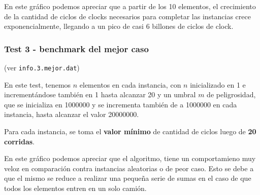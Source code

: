 \vspace*{0.5cm}


\vspace*{0.5cm}

En este gráfico podemos apreciar que a partir de los 10 elementos, el
crecimiento de la cantidad de ciclos de clocks necesarios para completar las
instancias crece exponencialmente, llegando a un pico de casi 6 billones de
ciclos de clock.


\newpage
\subsubsection{Test 3 - benchmark del mejor caso}

(ver \verb|info.3.mejor.dat|) \medskip

En este test, tenemos $n$ elementos en cada instancia, con $n$ inicializado en 1 e incrementándose
también en 1 hasta alcanzar 20 y un umbral $m$ de peligrosidad, que se inicializa en 1000000 y se incrementa
también de a 1000000 en cada instancia, hasta alcanzar el valor 20000000.

Para cada instancia, se toma el \textbf{valor mínimo} de cantidad de ciclos luego de \textbf{20 corridas}.




En este gráfico podemos apreciar que el algoritmo, tiene un comportamieno
muy veloz en comparación contra instancias aleatorias o de peor caso. Esto
se debe a que el mismo se reduce a realizar una pequeña serie de sumas en el
caso de que todos los elementos entren en un solo camión.
